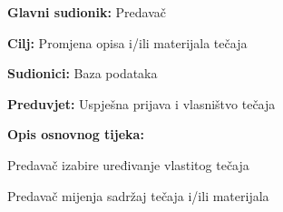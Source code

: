 			\begin{packed_item}
				
				\item \textbf{Glavni sudionik:} Predavač
				\item  \textbf{Cilj:} Promjena opisa i/ili materijala tečaja
				\item  \textbf{Sudionici:} Baza podataka
				\item  \textbf{Preduvjet:} Uspješna prijava i vlasništvo tečaja
 				\item  \textbf{Opis osnovnog tijeka:}
				
				\item[] \begin{packed_enum}
					
					\item Predavač izabire uređivanje vlastitog tečaja
					\item Predavač mijenja sadržaj tečaja i/ili materijala
					
				\end{packed_enum}
				
			\end{packed_item}	
			\noindent {}
